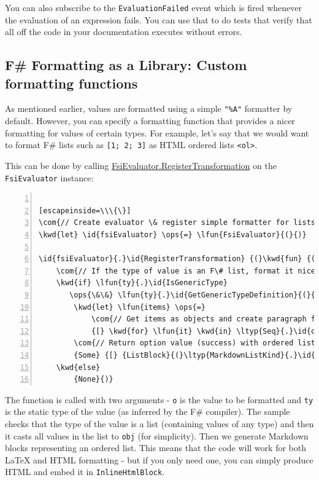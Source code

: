 \documentclass{article}
\newcommand{\id}[1]{\textcolor{black}{#1}}
\newcommand{\com}[1]{\textcolor{officegreen}{#1}}
\newcommand{\kwd}[1]{\textcolor{navy}{#1}}
\newcommand{\ops}[1]{\textcolor{purple}{#1}}
\begin{document}
You can also subscribe to the \texttt{EvaluationFailed} event which is fired whenever the evaluation
of an expression fails. You can use that to do tests that verify that all off the code in your
documentation executes without errors.
\subsection*{F\# Formatting as a Library: Custom formatting functions}



As mentioned earlier, values are formatted using a simple \texttt{"\%A"} formatter by default.
However, you can specify a formatting function that provides a nicer formatting for values
of certain types. For example, let's say that we would want to format F\# lists such as
\texttt{[1; 2; 3]} as HTML ordered lists \texttt{<ol>}.


This can be done by calling \href{https://fsprojects.github.io/FSharp.Formatting/reference/fsharp-formatting-literate-evaluation-fsievaluator.html}{FsiEvaluator.RegisterTransformation} on the \texttt{FsiEvaluator} instance:
\begin{lstlisting}[numbers=left]

[escapeinside=\\\{\}]
\com{// Create evaluator \& register simple formatter for lists}
\kwd{let} \id{fsiEvaluator} \ops{=} \lfun{FsiEvaluator}{(}{)}

\id{fsiEvaluator}{.}\id{RegisterTransformation} {(}\kwd{fun} {(}\lfun{o}{,} \lfun{ty}{,} \id{\_executionCount}{)} \kwd{->}
    \com{// If the type of value is an F\# list, format it nicely}
    \kwd{if} \lfun{ty}{.}\id{IsGenericType}
       \ops{\&\&} \lfun{ty}{.}\id{GetGenericTypeDefinition}{(}{)} \ops{=} \kwd{typedefof}{<}\ltyp{list}{<}\id{\_}{>}{>} \kwd{then}
        \kwd{let} \lfun{items} \ops{=}
            \com{// Get items as objects and create paragraph for each item}
            {[} \kwd{for} \lfun{it} \kwd{in} \ltyp{Seq}{.}\id{cast}{<}\ltyp{obj}{>} {(}\lfun{unbox} \lfun{o}{)} \kwd{->} {[} {Paragraph}{(}{[} {Literal}{(}\lfun{it}{.}\id{ToString}{(}{)}{,} {None}{)} {]}{,} {None}{)} {]} {]}
        \com{// Return option value (success) with ordered list}
        {Some} {[} {ListBlock}{(}\ltyp{MarkdownListKind}{.}\id{Ordered}{,} \lfun{items}{,} {None}{)} {]}
    \kwd{else}
        {None}{)}

\end{lstlisting}



The function is called with two arguments - \texttt{o} is the value to be formatted and \texttt{ty}
is the static type of the value (as inferred by the F\# compiler). The sample checks
that the type of the value is a list (containing values of any type) and then it
casts all values in the list to \texttt{obj} (for simplicity). Then we generate Markdown
blocks representing an ordered list. This means that the code will work for both
LaTeX and HTML formatting - but if you only need one, you can simply produce HTML and
embed it in \texttt{InlineHtmlBlock}.
\end{document}
